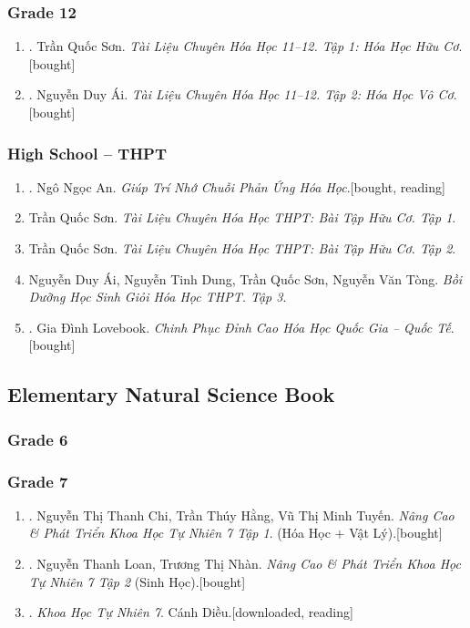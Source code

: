 \documentclass{article}
\begin{document}
\subsubsection{Grade 12}

\begin{enumerate}	
	\item \cite{Son2021}. Trần Quốc Sơn. \textit{Tài Liệu Chuyên Hóa Học 11--12. Tập 1: Hóa Học Hữu Cơ}.\hfill\textsf{[bought]}
	\item \cite{Ai2022}. Nguyễn Duy Ái. \textit{Tài Liệu Chuyên Hóa Học 11--12. Tập 2: Hóa Học Vô Cơ}.\hfill\textsf{[bought]}
\end{enumerate}

\subsubsection{High School -- THPT}

\begin{enumerate}
	\item \cite{An_chuoi_PUHH}. Ngô Ngọc An. \textit{Giúp Trí Nhớ Chuỗi Phản Ứng Hóa Học}.\hfill\textsf{[bought, reading]}
	\item Trần Quốc Sơn. \textit{Tài Liệu Chuyên Hóa Học THPT: Bài Tập Hữu Cơ. Tập 1}.
	\item Trần Quốc Sơn. \textit{Tài Liệu Chuyên Hóa Học THPT: Bài Tập Hữu Cơ. Tập 2}.
	\item Nguyễn Duy Ái, Nguyễn Tinh Dung, Trần Quốc Sơn, Nguyễn Văn Tòng. \textit{Bồi Dưỡng Học Sinh Giỏi Hóa Học THPT. Tập 3}.
	\item \cite{Lovebook2022}. Gia Đình Lovebook. \textit{Chinh Phục Đỉnh Cao Hóa Học Quốc Gia -- Quốc Tế}.\hfill\textsf{[bought]}
\end{enumerate}

\subsection{Elementary Natural Science Book}

\subsubsection{Grade 6}

\subsubsection{Grade 7}

\begin{enumerate}
	\item \cite{Chi_Hang_Tuyen2022}. Nguyễn Thị Thanh Chi, Trần Thúy Hằng, Vũ Thị Minh Tuyến. \textit{Nâng Cao \& Phát Triển Khoa Học Tự Nhiên 7 Tập 1}. (Hóa Học $+$ Vật Lý).\hfill\textsf{[bought]}
	\item \cite{Loan_Nhan2022}. Nguyễn Thanh Loan, Trương Thị Nhàn. \textit{Nâng Cao \& Phát Triển Khoa Học Tự Nhiên 7 Tập 2} (Sinh Học).\hfill\textsf{[bought]}
	\item \cite{SGK_KHTN_7_Canh_Dieu}. \textit{Khoa Học Tự Nhiên 7}. Cánh Diều.\hfill\textsf{[downloaded, reading]}
\end{enumerate}
\end{document}
